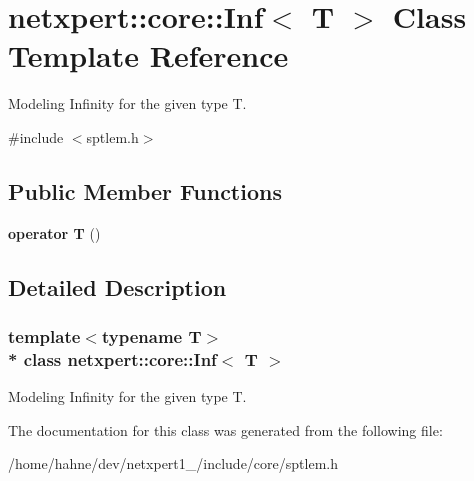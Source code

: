 \hypertarget{classnetxpert_1_1core_1_1Inf}{}\section{netxpert\+:\+:core\+:\+:Inf$<$ T $>$ Class Template Reference}
\label{classnetxpert_1_1core_1_1Inf}


Modeling Infinity for the given type T.  




{\ttfamily \#include $<$sptlem.\+h$>$}

\subsection*{Public Member Functions}
\begin{DoxyCompactItemize}
\item 
{\bfseries operator T} ()\hypertarget{classnetxpert_1_1core_1_1Inf_a850daa0b653488313b63afe256aa0c58}{}\label{classnetxpert_1_1core_1_1Inf_a850daa0b653488313b63afe256aa0c58}

\end{DoxyCompactItemize}


\subsection{Detailed Description}
\subsubsection*{template$<$typename T$>$\\*
class netxpert\+::core\+::\+Inf$<$ T $>$}

Modeling Infinity for the given type T. 

The documentation for this class was generated from the following file\+:\begin{DoxyCompactItemize}
\item 
/home/hahne/dev/netxpert1\+\_/include/core/sptlem.\+h\end{DoxyCompactItemize}
